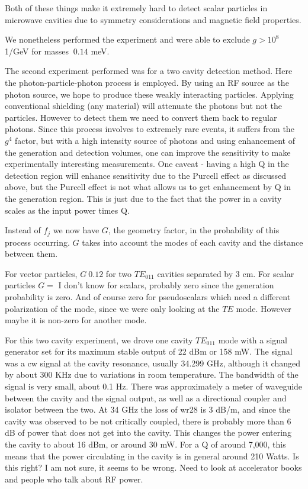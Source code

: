 \documentclass[11pt]{article}
\begin{document}
Both of these things make it extremely hard to detect scalar particles in microwave cavities due to symmetry considerations and magnetic field properties.

We nonetheless performed the experiment and were able to exclude $g > 10^{8}$ 1/GeV for masses $~0.14$ meV.

The second experiment performed was for a two cavity detection method. Here the photon-particle-photon process is employed. By using an RF source as the photon source, we hope to produce these weakly interacting particles. Applying conventional shielding (any material) will attenuate the photons but not the particles. However to detect them we need to convert them back to regular photons. Since this process involves to extremely rare events, it suffers from the $g^4$ factor, but with a high intensity source of photons and using enhancement of the generation and detection volumes, one can improve the sensitivity to make experimentally interesting measurements. One caveat - having a high Q in the detection region will enhance sensitivity due to the Purcell effect as discussed above, but the Purcell effect is not what allows us to get enhancement by Q in the generation region. This is just due to the fact that the power in a cavity scales as the input power times Q.

Instead of $f_j$ we now have $G$, the geometry factor, in the probability of this process occurring. $G$ takes into account the modes of each cavity and the distance between them.

For vector particles, $G ~ 0.12$ for two $TE_{011}$ cavities separated by 3 cm. For scalar particles $G = $ I don't know for scalars, probably zero since the generation probability is zero. And of course zero for pseudoscalars which need a different polarization of the mode, since we were only looking at the $TE$ mode. However maybe it is non-zero for another mode.

For this two cavity experiment, we drove one cavity $TE_{011}$ mode with a signal generator set for its maximum stable output of 22 dBm or 158 mW. The signal was a cw signal at the cavity resonance, usually 34.299 GHz, although it changed by about 300 KHz due to variations in room temperature. The bandwidth of the signal is very small, about 0.1 Hz. There was approximately a meter of waveguide between the cavity and the signal output, as well as a directional coupler and isolator between the two. At 34 GHz the loss of wr28 is 3 dB/m, and since the cavity was observed to be not critically coupled, there is probably more than 6 dB of power that does not get into the cavity. This changes the power entering the cavity to about 16 dBm, or around 30 mW. For a Q of  around 7,000,  this means that the power circulating in the cavity is in general around 210 Watts. Is this right? I am not sure, it seems to be wrong. Need to look at accelerator books and people who talk about RF power.
\end{document}
